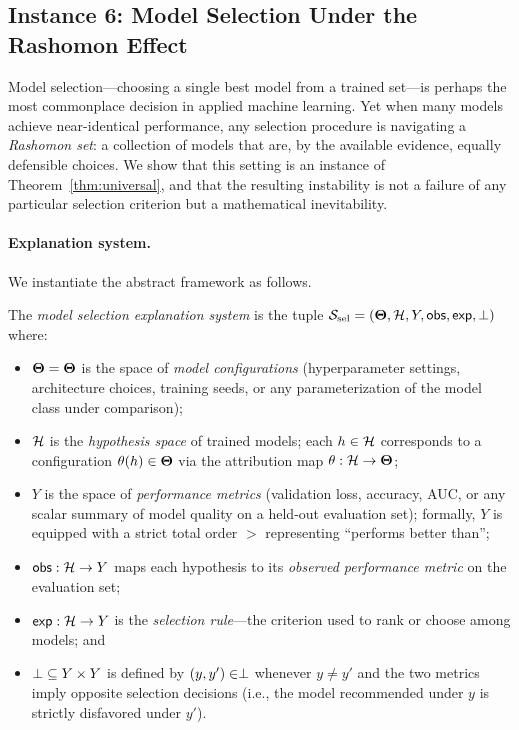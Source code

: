 \subsection{Instance 6: Model Selection Under the Rashomon Effect}
\label{sec:instance-selection}

Model selection---choosing a single best model from a trained set---is perhaps
the most commonplace decision in applied machine learning.  Yet when many models
achieve near-identical performance, any selection procedure is navigating a
\emph{Rashomon set}: a collection of models that are, by the available evidence,
equally defensible choices.  We show that this setting is an instance of
Theorem~\ref{thm:universal}, and that the resulting instability is not a
failure of any particular selection criterion but a mathematical inevitability.

\paragraph{Explanation system.}
We instantiate the abstract framework as follows.

\begin{definition}
\label{def:ms-system}
The \emph{model selection explanation system} is the tuple
$\mathcal{S}_{\mathrm{sel}} = (\mathbf{\Theta}, \mathcal{H}, Y, \mathsf{obs}, \mathsf{exp}, \perp)$ where:
\begin{itemize}
  \item $\mathbf{\Theta} = \mathbf{\Theta}$ is the space of \emph{model configurations}
    (hyperparameter settings, architecture choices, training seeds, or any
    parameterization of the model class under comparison);

  \item $\mathcal{H}$ is the \emph{hypothesis space} of trained models; each
    $h \in \mathcal{H}$ corresponds to a configuration $\theta(h) \in \mathbf{\Theta}$ via
    the attribution map $\theta: \mathcal{H} \to \mathbf{\Theta}$;

  \item $Y$ is the space of \emph{performance metrics} (validation loss,
    accuracy, AUC, or any scalar summary of model quality on a held-out
    evaluation set); formally, $Y$ is equipped with a strict total order
    $>$ representing ``performs better than'';

  \item $\mathsf{obs}: \mathcal{H} \to Y$ maps each hypothesis to its
    \emph{observed performance metric} on the evaluation set;

  \item $\mathsf{exp}: \mathcal{H} \to Y$ is the \emph{selection rule}---the
    criterion used to rank or choose among models; and

  \item $\perp\;\subseteq Y \times Y$ is defined by $(y, y') \in \perp$
    whenever $y \neq y'$ and the two metrics imply opposite selection
    decisions (i.e., the model recommended under $y$ is strictly
    disfavored under $y'$).
\end{itemize}
\end{definition}

